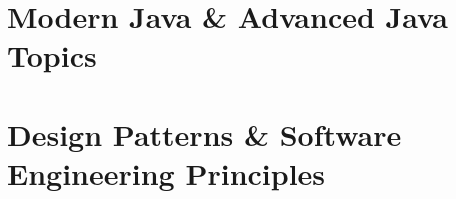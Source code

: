 \chapter{Modern Java \& Advanced Java Topics}
\thispagestyle{chapterstart}
\pagestyle{otherpages}
\label{chapter-modern}
\setcounter{excounter}{1}


\chapter{Design Patterns \& Software Engineering Principles}
\thispagestyle{chapterstart}
\pagestyle{otherpages}
\label{chapter-swe}
\setcounter{excounter}{1}



\backmatter
\thispagestyle{chapterstart}
\pagestyle{otherpages}
% 

% 

% 

% 

% 
% 
\printindex

